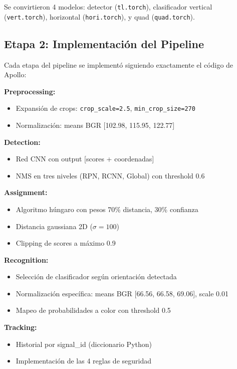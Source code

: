 Se convirtieron 4 modelos: detector (\texttt{tl.torch}), clasificador vertical (\texttt{vert.torch}), horizontal (\texttt{hori.torch}), y quad (\texttt{quad.torch}).

\subsection{Etapa 2: Implementación del Pipeline}

Cada etapa del pipeline se implementó siguiendo exactamente el código de Apollo:

\textbf{Preprocessing:}
\begin{itemize}
    \item Expansión de crops: \texttt{crop\_scale=2.5}, \texttt{min\_crop\_size=270}
    \item Normalización: means BGR [102.98, 115.95, 122.77]
\end{itemize}

\textbf{Detection:}
\begin{itemize}
    \item Red CNN con output [scores + coordenadas]
    \item NMS en tres niveles (RPN, RCNN, Global) con threshold 0.6
\end{itemize}

\textbf{Assignment:}
\begin{itemize}
    \item Algoritmo húngaro con pesos 70\% distancia, 30\% confianza
    \item Distancia gaussiana 2D ($\sigma=100$)
    \item Clipping de scores a máximo 0.9
\end{itemize}

\textbf{Recognition:}
\begin{itemize}
    \item Selección de clasificador según orientación detectada
    \item Normalización específica: means BGR [66.56, 66.58, 69.06], scale 0.01
    \item Mapeo de probabilidades a color con threshold 0.5
\end{itemize}

\textbf{Tracking:}
\begin{itemize}
    \item Historial por signal\_id (diccionario Python)
    \item Implementación de las 4 reglas de seguridad
\end{itemize}


